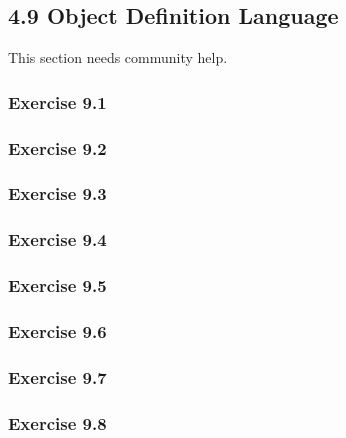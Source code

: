 \documentclass[../../main.tex]{subfiles}
\begin{document}
\subsection{4.9 Object Definition Language}

This section needs community help.

\subsubsection*{Exercise 9.1}

\subsubsection*{Exercise 9.2}

\subsubsection*{Exercise 9.3}

\subsubsection*{Exercise 9.4}

\subsubsection*{Exercise 9.5}

\subsubsection*{Exercise 9.6}

\subsubsection*{Exercise 9.7}

\subsubsection*{Exercise 9.8}
\end{document}
